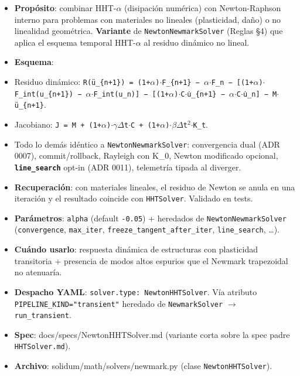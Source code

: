 \documentclass[11pt,letterpaper,oneside]{report}
\begin{document}
\begin{itemize}
  \item \textbf{Propósito}: combinar HHT-\ensuremath{\alpha} (disipación numérica) con Newton-Raphson interno para problemas con materiales no lineales (plasticidad, daño) o no linealidad geométrica. \textbf{Variante} de \texttt{NewtonNewmarkSolver} (Reglas §4) que aplica el esquema temporal HHT-\ensuremath{\alpha} al residuo dinámico no lineal.
  \item \textbf{Esquema}:
  \item Residuo dinámico: \texttt{R(ü\_\{n+1\}) = (1+\ensuremath{\alpha})\ensuremath{\cdot}F\_\{n+1\} − \ensuremath{\alpha}\ensuremath{\cdot}F\_n − [(1+\ensuremath{\alpha})\ensuremath{\cdot}F\_int(u\_\{n+1\}) − \ensuremath{\alpha}\ensuremath{\cdot}F\_int(u\_n)] − [(1+\ensuremath{\alpha})\ensuremath{\cdot}C\ensuremath{\cdot}u̇\_\{n+1\} − \ensuremath{\alpha}\ensuremath{\cdot}C\ensuremath{\cdot}u̇\_n] − M\ensuremath{\cdot}ü\_\{n+1\}}.
  \item Jacobiano: \texttt{J = M + (1+\ensuremath{\alpha})\ensuremath{\cdot}\ensuremath{\gamma}\ensuremath{\Delta}t\ensuremath{\cdot}C + (1+\ensuremath{\alpha})\ensuremath{\cdot}\ensuremath{\beta}\ensuremath{\Delta}t\ensuremath{^{2}}\ensuremath{\cdot}K\_t}.
  \item Todo lo demás idéntico a \texttt{NewtonNewmarkSolver}: convergencia dual (ADR 0007), commit/rollback, Rayleigh con K\_0, Newton modificado opcional, \textbf{\texttt{line\_search}} opt-in (ADR 0011), telemetría tipada al diverger.
  \item \textbf{Recuperación}: con materiales lineales, el residuo de Newton se anula en una iteración y el resultado coincide con \texttt{HHTSolver}. Validado en tests.
  \item \textbf{Parámetros}: \texttt{alpha} (default \texttt{-0.05}) + heredados de \texttt{NewtonNewmarkSolver} (\texttt{convergence}, \texttt{max\_iter}, \texttt{freeze\_tangent\_after\_iter}, \texttt{line\_search}, \ldots{}).
  \item \textbf{Cuándo usarlo}: respuesta dinámica de estructuras con plasticidad transitoria + presencia de modos altos espurios que el Newmark trapezoidal no atenuaría.
  \item \textbf{Despacho YAML}: \texttt{solver.type: NewtonHHTSolver}. Vía atributo \texttt{PIPELINE\_KIND="transient"} heredado de \texttt{NewmarkSolver} \ensuremath{\to} \texttt{run\_transient}.
  \item \textbf{Spec}: docs/specs/NewtonHHTSolver.md (variante corta sobre la spec padre \texttt{HHTSolver.md}).
  \item \textbf{Archivo}: solidum/math/solvers/newmark.py (clase \texttt{NewtonHHTSolver}).
\end{itemize}
\end{document}
